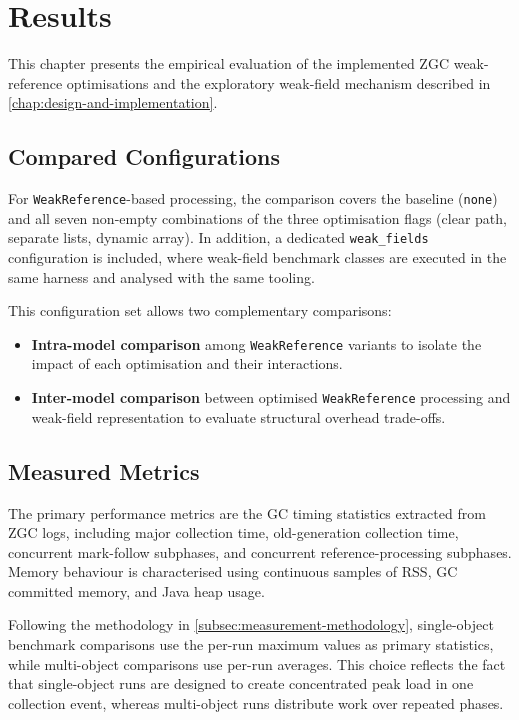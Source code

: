\chapter{Results}
\label{chap:results}

This chapter presents the empirical evaluation of the implemented ZGC weak-reference optimisations and the exploratory weak-field mechanism described in \cref{chap:design-and-implementation}.

\section{Compared Configurations}
\label{sec:results-configurations}

For \texttt{WeakReference}-based processing, the comparison covers the baseline (\texttt{none}) and all seven non-empty combinations of the three optimisation flags (clear path, separate lists, dynamic array). In addition, a dedicated \texttt{weak\_fields} configuration is included, where weak-field benchmark classes are executed in the same harness and analysed with the same tooling.

This configuration set allows two complementary comparisons:
\begin{itemize}
	\item \textbf{Intra-model comparison} among \texttt{WeakReference} variants to isolate the impact of each optimisation and their interactions.
	\item \textbf{Inter-model comparison} between optimised \texttt{WeakReference} processing and weak-field representation to evaluate structural overhead trade-offs.
\end{itemize}

\section{Measured Metrics}
\label{sec:results-metrics}

The primary performance metrics are the GC timing statistics extracted from ZGC logs, including major collection time, old-generation collection time, concurrent mark-follow subphases, and concurrent reference-processing subphases. Memory behaviour is characterised using continuous samples of RSS, GC committed memory, and Java heap usage.

Following the methodology in \cref{subsec:measurement-methodology}, single-object benchmark comparisons use the per-run maximum values as primary statistics, while multi-object comparisons use per-run averages. This choice reflects the fact that single-object runs are designed to create concentrated peak load in one collection event, whereas multi-object runs distribute work over repeated phases.

